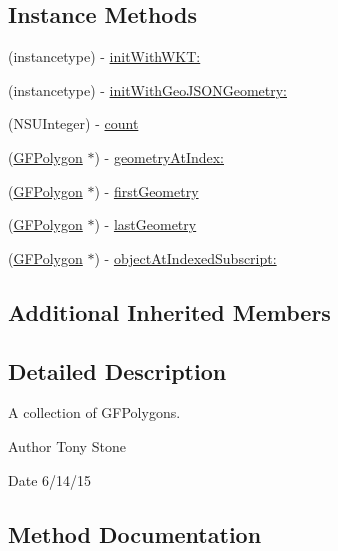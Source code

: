 \subsection*{Instance Methods}
\begin{DoxyCompactItemize}
\item 
(instancetype) -\/ \hyperlink{interface_g_f_multi_polygon_a321e0b2c64e6dbe079205f1c58a17a2f}{init\+With\+W\+K\+T\+:}
\item 
(instancetype) -\/ \hyperlink{interface_g_f_multi_polygon_a2c8f29141e272aad174a9f65190d7cab}{init\+With\+Geo\+J\+S\+O\+N\+Geometry\+:}
\item 
(N\+S\+U\+Integer) -\/ \hyperlink{interface_g_f_multi_polygon_a268a15cb86f1a8a57bb9f7c7f07b6443}{count}
\item 
(\hyperlink{interface_g_f_polygon}{G\+F\+Polygon} $\ast$) -\/ \hyperlink{interface_g_f_multi_polygon_ab18a262a8d02f4b15250bad1d8073f2a}{geometry\+At\+Index\+:}
\item 
(\hyperlink{interface_g_f_polygon}{G\+F\+Polygon} $\ast$) -\/ \hyperlink{interface_g_f_multi_polygon_a7dca748ca40ba2e1de638d4aaf251144}{first\+Geometry}
\item 
(\hyperlink{interface_g_f_polygon}{G\+F\+Polygon} $\ast$) -\/ \hyperlink{interface_g_f_multi_polygon_a8aa2546c3a714b390a5d2580d1356b62}{last\+Geometry}
\item 
(\hyperlink{interface_g_f_polygon}{G\+F\+Polygon} $\ast$) -\/ \hyperlink{interface_g_f_multi_polygon_ac0de2e4160cbb5e83522fc72502f681c}{object\+At\+Indexed\+Subscript\+:}
\end{DoxyCompactItemize}
\subsection*{Additional Inherited Members}


\subsection{Detailed Description}
A collection of G\+F\+Polygons. 

\begin{DoxyAuthor}{Author}
Tony Stone 
\end{DoxyAuthor}
\begin{DoxyDate}{Date}
6/14/15 
\end{DoxyDate}


\subsection{Method Documentation}
\hypertarget{interface_g_f_multi_polygon_a321e0b2c64e6dbe079205f1c58a17a2f}{}
